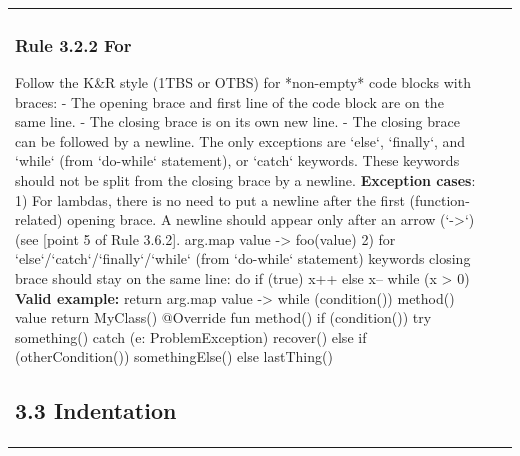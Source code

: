 \begin{center}
\begin{tabular}{ |p{}|p{}|p{}| }
\subsubsection*{\textbf{Rule 3.2.2 For}}
Follow the K\&R style (1TBS or OTBS) for *non-empty* code blocks with braces:
- The opening brace and first line of the code block are on the same line.
- The closing brace is on its own new line.
- The closing brace can be followed by a newline. The only exceptions are `else`, `finally`, and `while` (from `do-while` statement), or `catch` keywords.
These keywords should not be split from the closing brace by a newline.
\textbf{Exception cases}:
1) For lambdas, there is no need to put a newline after the first (function-related) opening brace. A newline should appear only after an arrow (`->`) (see [point 5 of Rule 3.6.2].
arg.map { value ->
    foo(value)
}
2) for `else`/`catch`/`finally`/`while` (from `do-while` statement) keywords closing brace should stay on the same line:
do {
    if (true) {
        x++
    } else {
        x--
    }
} while (x > 0)
\textbf{Valid example:}
        return arg.map { value ->
            while (condition()) {
                method()
            }
            value
        }
        return MyClass() {
            @Override
              fun method() {
                if (condition()) {
                    try {
                        something()
                    } catch (e: ProblemException) {
                        recover()
                    }
                } else if (otherCondition()) {
                    somethingElse()
                } else {
                    lastThing()
                }
            }
        }
\subsection*{\textbf{3.3 Indentation}}

\end{tabular}
\end{center}
